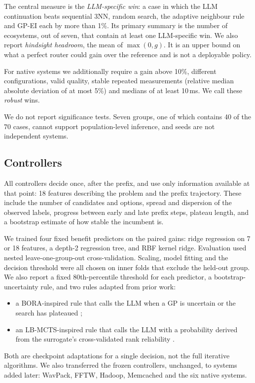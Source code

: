 The central measure is the \emph{LLM-specific win}: a case in which the LLM continuation beats sequential 3NN, random search, the adaptive neighbour rule and GP-EI each by more than 1\%. Its primary summary is the number of ecosystems, out of seven, that contain at least one LLM-specific win. We also report \emph{hindsight headroom}, the mean of $\max(0, g)$. It is an upper bound on what a perfect router could gain over the reference and is not a deployable policy.

For native systems we additionally require a gain above 10\%, different configurations, valid quality, stable repeated measurements (relative median absolute deviation of at most 5\%) and medians of at least 10\,ms. We call these \emph{robust} wins.

We do not report significance tests. Seven groups, one of which contains 40 of the 70 cases, cannot support population-level inference, and seeds are not independent systems.

\subsection{Controllers}

All controllers decide once, after the prefix, and use only information available at that point: 18 features describing the problem and the prefix trajectory. These include the number of candidates and options, spread and dispersion of the observed labels, progress between early and late prefix steps, plateau length, and a bootstrap estimate of how stable the incumbent is.

We trained four fixed benefit predictors on the paired gains: ridge regression on 7 or 18 features, a depth-2 regression tree, and RBF kernel ridge. Evaluation used nested leave-one-group-out cross-validation. Scaling, model fitting and the decision threshold were all chosen on inner folds that exclude the held-out group. We also report a fixed 80th-percentile threshold for each predictor, a bootstrap-uncertainty rule, and two rules adapted from prior work:
\begin{itemize}
  \item a BORA-inspired rule that calls the LLM when a GP is uncertain or the search has plateaued \cite{cisse2025bora};
  \item an LB-MCTS-inspired rule that calls the LLM with a probability derived from the surrogate's cross-validated rank reliability \cite{xu2026lbmcts}.
\end{itemize}
Both are checkpoint adaptations for a single decision, not the full iterative algorithms. We also transferred the frozen controllers, unchanged, to systems added later: WavPack, FFTW, Hadoop, Memcached and the six native systems.

